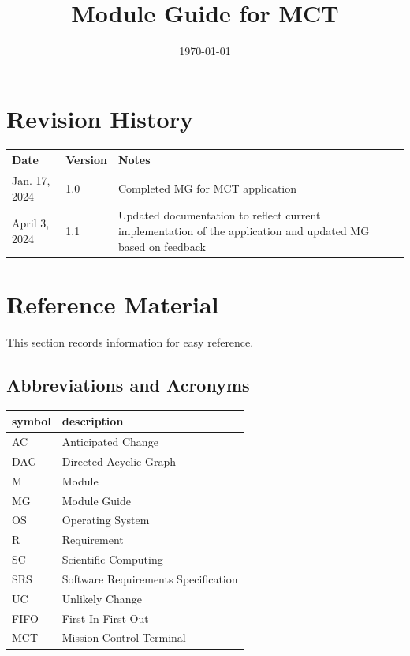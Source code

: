 \documentclass[12pt, titlepage]{article}
\begin{document}
\title{Module Guide for MCT }
\author{\authname}
\date{\today}

\maketitle


\section{Revision History}

\begin{tabularx}{\textwidth}{p{3cm}p{2cm}X}
\toprule {\bf Date} & {\bf Version} & {\bf Notes}\\
\midrule
Jan. 17, 2024 & 1.0 & Completed MG for MCT application\\
April 3, 2024 & 1.1 & Updated documentation to reflect current implementation of the application and updated MG based on feedback\\
\bottomrule
\end{tabularx}

\newpage

\section{Reference Material}

This section records information for easy reference.

\subsection{Abbreviations and Acronyms}

\renewcommand{\arraystretch}{1.2}
\begin{tabular}{l l} 
  \toprule		
  \textbf{symbol} & \textbf{description}\\
  \midrule 
  AC & Anticipated Change\\
  DAG & Directed Acyclic Graph \\
  M & Module \\
  MG & Module Guide \\
  OS & Operating System \\
  R & Requirement\\
  SC & Scientific Computing \\
  SRS & Software Requirements Specification\\
  UC & Unlikely Change \\
  FIFO & First In First Out \\
  MCT & Mission Control Terminal\\
  \bottomrule
\end{tabular}\\
\end{document}
